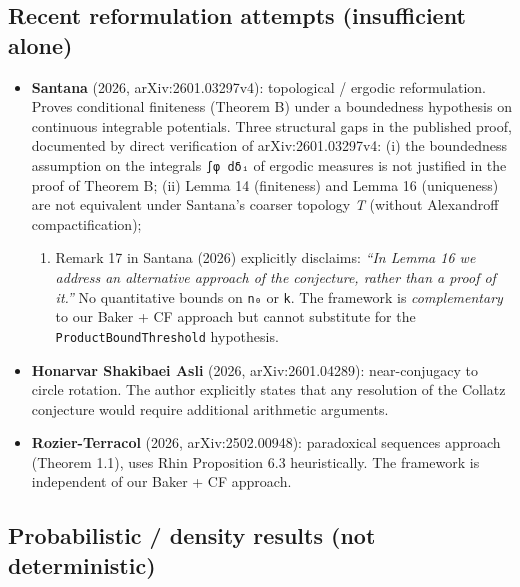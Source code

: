 \documentclass[
  11pt]{amsart}
\providecommand{\tightlist}{%
  \setlength{\itemsep}{0pt}\setlength{\parskip}{0pt}}
\theoremstyle{plain}
\theoremstyle{definition}
\theoremstyle{remark}
\begin{document}
\subsection{Recent reformulation attempts (insufficient
alone)}\label{recent-reformulation-attempts-insufficient-alone}

\begin{itemize}
\tightlist
\item
  \textbf{Santana} (2026, arXiv:2601.03297v4): topological / ergodic
  reformulation. Proves conditional finiteness (Theorem B) under a
  boundedness hypothesis on continuous integrable potentials. Three
  structural gaps in the published proof, documented by direct
  verification of arXiv:2601.03297v4: (i) the boundedness assumption on
  the integrals \texttt{∫φ\ dδᵢ} of ergodic measures is not justified in
  the proof of Theorem B; (ii) Lemma 14 (finiteness) and Lemma 16
  (uniqueness) are not equivalent under Santana's coarser topology
  \emph{T} (without Alexandroff compactification);

  \begin{enumerate}
  \def\labelenumi{(\roman{enumi})}
  \setcounter{enumi}{2}
  \tightlist
  \item
    Remark 17 in Santana (2026) explicitly disclaims: \emph{``In Lemma
    16 we address an alternative approach of the conjecture, rather than
    a proof of it.''} No quantitative bounds on \texttt{n₀} or
    \texttt{k}. The framework is \emph{complementary} to our Baker + CF
    approach but cannot substitute for the
    \texttt{ProductBoundThreshold} hypothesis.
  \end{enumerate}
\item
  \textbf{Honarvar Shakibaei Asli} (2026, arXiv:2601.04289):
  near-conjugacy to circle rotation. The author explicitly states that
  any resolution of the Collatz conjecture would require additional
  arithmetic arguments.
\item
  \textbf{Rozier-Terracol} (2026, arXiv:2502.00948): paradoxical
  sequences approach (Theorem 1.1), uses Rhin Proposition 6.3
  heuristically. The framework is independent of our Baker + CF
  approach.
\end{itemize}

\subsection{Probabilistic / density results (not
deterministic)}\label{probabilistic-density-results-not-deterministic}
\end{document}
